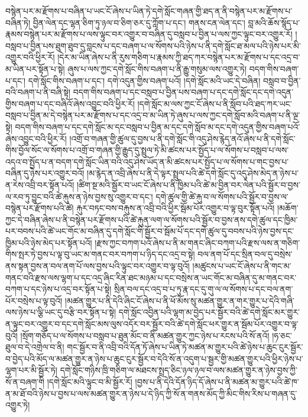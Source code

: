 བསྙེན་པར་མ་རྫོགས་པ་བཞིན་པ་ཡང་ངོ་ཞེས་པ་ཡིན་ཏེ་དགེ་སློང་གཞན་གྱི་ཐད་ན་ནི་བསྙེན་པར་མ་རྫོགས་པ་བཞིན་ཏེ། བྱིན་ལེན་དང་ལྷན་ཅིག་ཏུ་ཉལ་བ་ཅིག་ཅར་དུ་ཀློག་པ་དང་། གནས་ངན་ལེན་དང་། བླ་མའི་ཆོས་སྙོད་པ་རྣམས་བསྙེན་པར་མ་རྫོགས་པ་ལས་ལྟུང་བར་འགྱུར་བ་བཞིན་དུ་བསླབ་པ་བྱིན་པ་ལས་ཀྱང་ལྟུང་བར་འགྱུར་རོ། །བསླབ་པ་བྱིན་པས་ཐུག་ཐུབ་དུ་བླངས་པ་དང་བཞག་པ་ལ་སོགས་པའི་ཉེས་པ་ནི་དགེ་སློང་ཐ་མལ་པའི་ཉེས་པར་མི་འགྱུར་བའི་ཕྱིར་རོ། །དེར་མ་ཡིན་ཞེས་པ་ནི་རུས་གཅིག་པ་རྣམས་ཀྱི་ཐད་ཀར་བསྙེན་པར་མ་རྫོགས་པ་དང་འདྲ་བ་མ་ཡིན་པར་སྟོན་པ་སྟེ། ཞུས་པ་ལས་ཀྱང་དགེ་སློང་གིས་བཞག་པ་ནི་རྒྱུ་གསུམ་ལས་འགྱུར་ཏེ། བདག་གིས་བཞག་པ་དང་། དགེ་སློང་གིས་བཞག་པ་དང་། དགེ་འདུན་གྱིས་བཞག་པའོ། །དགེ་སློང་མའི་ཡང་དེ་བཞིན། བསླབ་བ་བྱིན་བའི་བཞག་པ་ནི་བཞི་སྟེ། བདག་གིས་བཞག་པ་དང་བསླབ་པ་བྱིན་པས་བཞག་པ་དང་དགེ་སློང་དང་དགེ་འདུན་གྱིས་བཞག་པ་དང་བཞིའོ་ཞེས་འབྱུང་བའི་ཕྱིར་རོ། །དགེ་སློང་མ་ལས་ཀྱང་ངོ་ཞེས་པ་ནི་སློབ་པའི་ཐད་ཀར་ཡང་བསླབ་པ་བྱིན་མ་དེ་བསྙེན་པར་མ་རྫོགས་པ་དང་འདྲ་བ་མ་ཡིན་ཏེ་ཞུས་པ་ལས་ཀྱང་དགེ་སློབ་མའི་བཞག་པ་ནི་ལྔ་སྟེ། བདག་གིས་བཞག་པ་དང་དགེ་སློང་མ་དང་བསླབ་པ་བྱིན་མ་དང་དགེ་སློབ་མ་དང་དགེ་འདུན་གྱིས་བཞག་པའོ་ཞེས་འབྱུང་བའི་ཕྱིར་རོ། །འགྲོ་བ་གཞན་གྱི་ཚུལ་དུ་བྱས་པ་ནི་དགེ་སློང་གི་འདུ་ཤེས་རྙེད་ནའོ་ཞེས་པ་ནི་དགེ་སློང་གིས་བྱོལ་སོང་ལ་སོགས་པ་འགྲོ་བ་གཞན་གྱི་རྒྱུད་དུ་སྤྲུལ་ཏེ་མི་ཚངས་པར་སྤྱོད་པ་ལ་སོགས་པ་བསླབ་པ་ལས་འདའ་བ་སྤྱོད་པ་ན་བདག་དགེ་སློང་ཡིན་བའི་འདུ་ཤེས་ཡོད་ན་མི་ཚངས་པར་སྤྱོད་པ་ལ་སོགས་པ་གང་བྱས་པ་བཞིན་དུ་ཉེས་པར་འགྱུར་བའོ། །མ་རྙེད་ན་འབྲི་ཞེས་པ་ནི་དེ་ལྟར་སྤྲུལ་པའི་ཚེ་དགེ་སློང་དུ་འདུ་ཤེས་མེད་ན་ཉེས་པ་ན་རེས་འབྲི་བར་སྟོན་པའོ། །ཚིག་སྔ་མའི་སྦྱོར་བ་ཡང་ངོ་ཞེས་པ་ནི་ཁྱིམ་པའི་ཚེ་མ་བྱིན་བར་ལེན་པའི་སྦྱོར་བ་བྱས་ལ་རབ་ཏུ་བྱུང་བའི་ཚེ་རྐུས་ན་ཉེས་བྱས་སུ་འགྱུར་བ་དང་། དགེ་ཚུལ་གྱི་ཚེ་རྐུ་བ་ལ་སོགས་པའི་སྦྱོར་བ་བྱས་ལ་བསྙེན་པར་རྫོགས་པའི་ཚེ། རྐུར་བཏང་བས་བརྐུས་ན་འབྲི་བའི་ཕྱིར་སྦོམ་པོར་འགྱུར་བ་ལྟ་བུར་སྟོན་པའོ། །མཆོག་ཀྱང་དེ་བཞིན་ཞེས་པ་ནི་བསྙེན་པར་རྫོགས་པའི་ཚེ་རྐུན་ལག་ལ་སོགས་པའི་སྦྱོར་བ་བྱས་ནས་དགེ་ཚུལ་དང་ཁྱིམ་པར་བབས་པའི་ཚེ་ཡང་གོང་མ་བཞིན་དུ་དགེ་སློང་གི་སྦྱོར་བ་སྦོམ་པོ་དང་དགེ་ཚུལ་དུ་བབས་པའི་ཉེས་བྱས་དང་ཁྱིམ་པའི་ཉེས་མེད་པར་སྟོན་པའོ། །རྫས་ཀྱང་བཀག་པའོ་ཞེས་པ་ནི་མ་གནང་ཞིང་བཀག་པའི་རྫས་ལས་ན་གཅིག་གིས་སྤར་ཏེ་བྱས་པ་ལྟ་བུ་ཡང་མ་གནང་བར་བཀག་པ་ཉིད་དང་འདྲ་བ་སྟེ། བལ་ནག་པོ་དང་སྲིན་བལ་དུ་བསྲེས་ནས་སྟན་བྱས་ན་བལ་ནག་པོ་ལས་བྱས་པའི་ལྟུང་བར་འགྱུར་བ་ལྟ་བུའོ། །མཚུངས་པ་ཡང་ངོ་ཞེས་པ་ནི་གང་མ་གནང་བའི་རྫས་ལས་ལྷག་པ་དང་འདྲ་ཞིང་རིན་ཐང་མཉམ་པ་དང་བསྲེས་ན་ཡང་གོང་མ་བཞིན་དུ་མ་གནང་བར་བཀག་པ་དང་ཉེས་པ་འདྲ་བར་སྟོན་པ་སྟེ། སྲིན་བལ་དང་འདྲ་བ་པ་ཏུ་རྣ་དང་དུ་གུ་ལ་ལ་སོགས་པ་དང་བལ་ནག་པོར་བསྲེས་པ་ལྟ་བུའོ། །མཚན་གྱུར་པ་ནི་དེའི་ཞིང་ངོ་ཞེས་པ་ནི་ཕོ་མོས་སུ་མཚན་གྱུར་ན་གར་གྱུར་པ་དེའི་གཞི་ལས་ཉེས་པ་ལྕི་ཡང་དུ་བརྩི་བར་སྟོན་པ་སྟེ། དགེ་སློང་འབྱིན་པའི་ལྷག་མ་བྱེད་པར་སྦྱོར་བའི་ཚེ་དགེ་སློང་མར་གྱུར་ན་ལྟུང་བར་འགྱུར་བ་དང་དགེ་སློང་མས་ལུས་འདོར་བར་སྦྱོར་བའི་ཚེ་དགེ་སློང་ཕར་གྱུར་ན་སྦོམ་པོར་འགྱུར་བ་ལྟ་བུའོ། །སྲོག་གཅོད་པ་ལ་སོགས་པ་བསླབ་པ་ཐུན་མོང་བ་ནི་མཚན་གྱུར་ཀྱང་ཉེས་པ་རངས་པའི་སོ་ནའོ། །ཧ་ཅང་ཐུལ་བ་དེ་འགྲེལ་བ་ནི། གང་སྦྱོར་བ་ནི་འབྲི་བའི་དོན་ཏོ་ཞེས་པ་ཡིན་ཏེ་མཚན་མ་གྱུར་པའི་ཚེ་ཉེས་པ་ཆུང་ངུར་སྦྱོར་བ་བྱེད་པའི་མོད་ལ་མཚན་གྱུར་ན་ཉེས་པ་ཆུང་ངུར་སྦྱོར་བ་དེའི་སོ་ན་འདུག་པ་སྦྱར་གྱི་མཚན་གྱུར་པའི་ཕྱིར་ཉེས་པ་ལྷག་པར་མི་སྦྱོར་ཏེ། དགེ་སློང་གཉིས་ཁྲི་གཅིག་ལ་མཐངས་སྤྲད་ཅིང་ཉལ་ཉལ་བ་ལས་མཚན་གྱུར་ན་ཉེས་བྱས་ཀྱི་སོ་ན་བཞག་གི །དགེ་སློང་མའི་ལྟུང་བ་མི་སྦྱོར་རོ། །བྱས་པ་ནི་དེའི་དོན་ཉིད་དོ་ཞེས་པ་ནི་མཚན་མ་གྱུར་པའི་ཚེ་ཁ་ན་མ་ཐོ་བའི་ཉེས་པ་བྱས་པ་ལས་མཚན་གྱུར་ན་ཉེས་པ་དེ་ཉིད་ཀྱི་སོ་ན་གནས་མོད་ཀྱི་མིང་གིས་རིས་པ་གཞན་དུ་འགྱུར་ཏེ། 